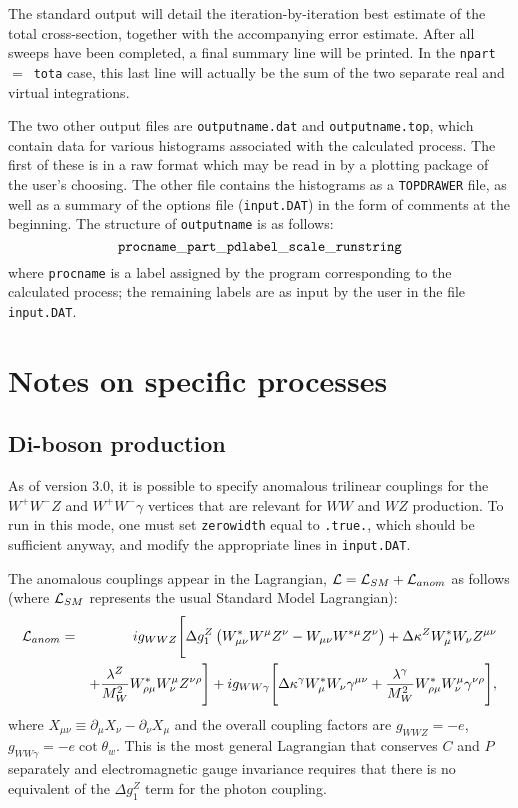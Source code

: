 \documentclass[12pt]{article}
\begin{document}
The standard output will detail the iteration-by-iteration best estimate
of the total cross-section, together with the accompanying error estimate.
After all sweeps have been completed, a final summary line will be printed.
In the {\tt npart}~$=$~{\tt tota} case, this last line will actually be the
sum of the two separate real and virtual integrations.

The two other output files are {\tt outputname.dat} and
{\tt outputname.top}, which contain data for various histograms associated
with the calculated process. The first of these is in a raw format 
which may be read in by a plotting package of the user's choosing. The
other file contains the histograms as a {\tt TOPDRAWER} file, as well
as a summary of the options file ({\tt input.DAT}) in the form of
comments at the beginning. The structure
of {\tt outputname} is as follows:
\begin{displaymath}
{\tt procname\_part\_pdlabel\_scale\_runstring}
\end{displaymath}
where {\tt procname} is a label assigned by the program corresponding to
the calculated process; the remaining labels are as input by the user
in the file {\tt input.DAT}.

\section{Notes on specific processes}
\label{sec:specific}

\subsection{Di-boson production}
\label{subsec:diboson}

As of version 3.0, it is possible to specify anomalous trilinear
couplings for the $W^+W^-Z$ and $W^+W^-\gamma$ vertices that are
relevant for $WW$ and $WZ$ production. To run in this mode, one
must set {\tt zerowidth} equal to {\tt .true.}, which should be
sufficient anyway, and modify the appropriate lines in {\tt input.DAT}.

The anomalous couplings appear in the Lagrangian,
${\cal L} = {\cal L}_{SM} + {\cal L}_{anom}$ as follows
(where ${\cal L}_{SM}$ represents the usual Standard Model Lagrangian):
\begin{eqnarray}
{\cal L}_{anom} & = & i g_{WWZ} \Biggl[
 \Delta g_1^Z \left( W^*_{\mu\nu}W^\mu Z^\nu - W_{\mu\nu}W^{*\mu} Z^\nu \right)
+\Delta\kappa^Z W^*_\mu W_\nu Z^{\mu\nu} \nonumber \\
 & &+
 \frac{\lambda^Z}{M_W^2} W^*_{\rho\mu} W^\mu_\nu Z^{\nu\rho} \Biggr]
+i g_{WW\gamma} \Biggl[ 
 \Delta\kappa^\gamma W^*_\mu W_\nu \gamma^{\mu\nu}
+\frac{\lambda^\gamma}{M_W^2} W^*_{\rho\mu} W^\mu_\nu\gamma^{\nu\rho}
 \Biggr], \nonumber
\end{eqnarray}
where $X_{\mu\nu} \equiv \partial_\mu X_{\nu} - \partial_\nu X_{\mu}$
and the overall coupling factors are $g_{WWZ}=-e$,
$g_{WW\gamma}=-e\cot\theta_w$.
This is the most general Lagrangian that conserves $C$ and $P$
separately and electromagnetic gauge invariance requires that there
is no equivalent of the $\Delta g_1^Z$ term for the photon coupling.
\end{document}
